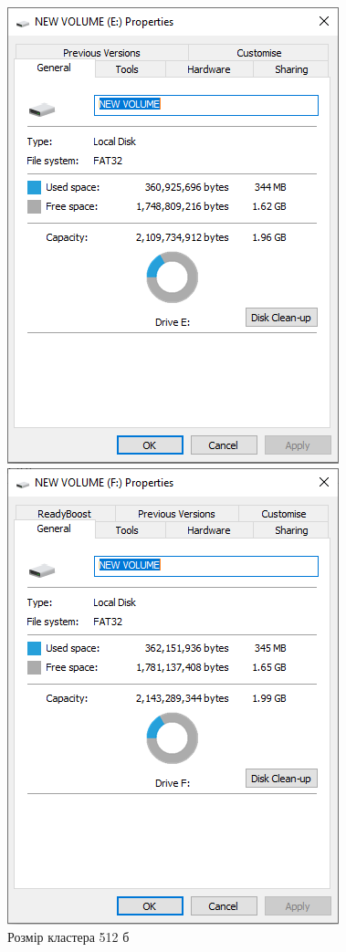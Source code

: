 \documentclass[oneside,14pt]{extarticle}
\begin{document}
\begin{normalsize}
	\begin{figure}[H]
		\centering
		\begin{minipage}{0.3\textwidth}
			\centering
			\includegraphics[scale=0.5]{4}
			\caption*{Розмір кластера 512 б}
		\end{minipage}
		\hfill
		\begin{minipage}{0.3\textwidth}
			\centering
			\includegraphics[scale=0.5]{5}

\end{minipage}
\end{figure}
\end{normalsize}
\end{document}
